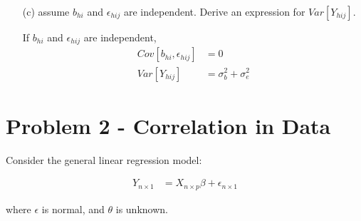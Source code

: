 \begin{itemize}
\item[(c)] assume $b_{hi}$ and $\epsilon_{hij}$ are independent. Derive an expression for $Var[Y_{hij}]$. 

If $b_{hi}$ and $\epsilon_{hij}$ are independent,
\begin{align*}
	Cov[b_{hi}, \epsilon_{hij}] &= 0\\
	Var[Y_{hij}] &= \sigma^2_b + \sigma^2_e
\end{align*}

\end{itemize}

\section{Problem 2 - Correlation in Data}
Consider the general linear regression model:

\begin{align*}
	Y_{n \times 1} &= X_{n \times p} \beta + \epsilon_{n \times 1}
\end{align*}

where $\epsilon$ is normal, and $\theta$ is unknown.

